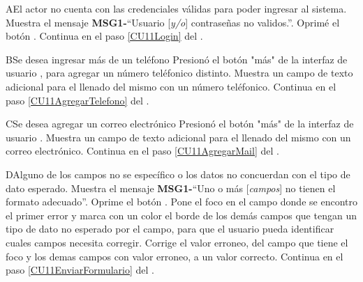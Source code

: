 		\begin{UCtrayectoriaA}{A}{El actor no cuenta con las credenciales válidas para poder ingresar al sistema.}
			\UCpaso Muestra el mensaje {\bf MSG1-}``Usuario [{\em y/o}] contraseñas no validos.''.
			\UCpaso[\UCactor] Oprimé el botón .
			\UCpaso Continua en el paso \ref{CU11Login} del .
		\end{UCtrayectoriaA}
		
		\begin{UCtrayectoriaA}{B}{Se desea ingresar más de un teléfono}
			\UCpaso[\UCactor] Presionó el botón "más" de la interfaz de usuario , para agregar un número teléfonico distinto.
			\UCpaso Muestra un campo de texto adicional para el llenado del mismo con un número teléfonico.
			\UCpaso Continua en el paso \ref{CU11AgregarTelefono} del . 
		\end{UCtrayectoriaA}
		
		\begin{UCtrayectoriaA}{C}{Se desea agregar un correo electrónico}
			\UCpaso[\UCactor] Presionó el botón "más" de la interfaz de usuario .
			\UCpaso Muestra un campo de texto adicional para el llenado del mismo con un correo electrónico.
			\UCpaso Continua en el paso \ref{CU11AgregarMail} del . 
		\end{UCtrayectoriaA}		
		
		\begin{UCtrayectoriaA}{D}{Alguno de los campos no se específico o los datos no concuerdan con el tipo de dato esperado.}
			\UCpaso Muestra el mensaje {\bf MSG1-}``Uno o más [{\em campos}] no tienen el formato adecuado''.
			\UCpaso[\UCactor] Oprime el botón .
			\UCpaso Pone el foco en el campo donde se encontro el primer error y marca con un color el borde de los demás campos que tengan un tipo de dato no esperado por el campo, para que el usuario pueda identificar cuales campos necesita corregir. 
			\UCpaso[\UCactor] Corrige el valor erroneo, del campo que tiene el foco y los demas campos con valor erroneo, a un valor correcto.
			\UCpaso Continua en el paso \ref{CU11EnviarFormulario} del .
		\end{UCtrayectoriaA}
		
